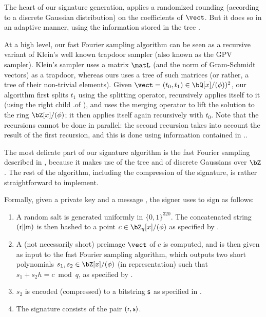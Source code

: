The heart of our signature generation, \longffsampling applies a randomized rounding (according to a discrete Gaussian distribution) on the coefficients of $\vect$. But it does so in an adaptive manner, using the information stored in the \falcon tree \tree.

At a high level, our fast Fourier sampling algorithm can be seen as a recursive variant of Klein's well known trapdoor sampler (also known as the GPV sampler). Klein's sampler uses a matrix $\matL$ (and the norm of Gram-Schmidt vectors) as a trapdoor, whereas ours uses a tree of such matrices (or rather, a tree of their non-trivial elements).
Given $\vect = (t_0, t_1) \in \bQ[x]/(\phi))^2$, our algorithm first splits $t_1$ using the splitting operator, recursively applies itself to it (using the right child \tree.\rchild of \tree), and uses the merging operator to lift the solution to the ring $\bZ[x]/(\phi)$; it then applies itself again recursively with $t_0$. Note that the recursions cannot be done in parallel: the second recursion takes into account the result of the first recursion, and this is done using information contained in \tree.\data.

The most delicate part of our signature algorithm is the fast Fourier sampling described in \ffsampling, because it makes use of the \falcon tree and of discrete Gaussians over $\bZ$. The rest of the algorithm, including the compression of the signature, is rather straightforward to implement.

Formally, given a private key \sk and a message \msg, the signer uses \sk to sign \msg as follows:
\begin{enumerate}
 \item A random salt \salt is generated uniformly in $\{0, 1\}^{320}$. The concatenated string $(\textsf{r}\|\textsf{m})$ is then hashed to a point $c \in \bZ_q[x]/(\phi)$ as specified by \longhashtopoint.
 \item A (not necessarily short) preimage $\vect$ of $c$ is computed, and is then given as input to the fast Fourier sampling algorithm, which outputs two short polynomials $s_1, s_2 \in \bZ[x]/(\phi)$ (in \fft representation) such that $s_1 + s_2 h = c \bmod q$, as specified by \longffsampling.
 \item $s_2$ is encoded (compressed) to a bitstring $\textsf{s}$ as specified in \longcompress.
 \item
 The signature consists of the pair $(\textsf{r}, \textsf{s})$.
\end{enumerate}


